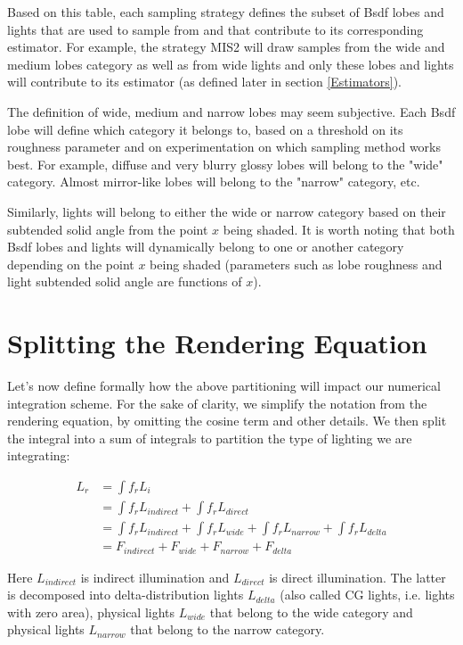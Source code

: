 \documentclass{article}
\begin{document}
Based on this table, each sampling strategy defines the
subset of Bsdf lobes and lights that are used to sample from and
that contribute to its corresponding estimator. For example, the
strategy MIS2 will draw samples from the wide and medium lobes category
as well as from wide lights and only these lobes and lights will contribute
to its estimator (as defined later in section \ref{Estimators}).

The definition of wide, medium and narrow lobes may seem subjective.
Each Bsdf lobe will define which category it belongs to, based
on a threshold on its roughness parameter and on experimentation on
which sampling method works best. For example, diffuse and very blurry
glossy lobes will belong to the "wide" category. Almost mirror-like
lobes will belong to the "narrow" category, etc.

Similarly, lights will belong to either the wide or narrow category
based on their subtended solid angle from the point $x$ being shaded.
It is worth noting that both Bsdf lobes and lights will dynamically belong
to one or another category depending on the point $x$ being shaded (parameters
such as lobe roughness and light subtended solid angle are functions of $x$).



\section{Splitting the Rendering Equation}\label{Splitting}

Let's now define formally how the above partitioning will impact our
numerical integration scheme. For the sake of clarity, we simplify
the notation from the rendering equation, by omitting the cosine
term and other details. We then split the integral into a sum of
integrals to partition the type of lighting we are integrating:

\begin{align*}
L_r &= \int f_r  L_i  \\
    &= \int f_r  L_{indirect}  +  \int f_r  L_{direct}  \\
    &= \int f_r  L_{indirect}  +  \int f_r  L_{wide}  +  \int f_r  L_{narrow}  +  \int f_r  L_{delta}  \\
    &= F_{indirect}  +  F_{wide}  +  F_{narrow}  +  F_{delta}
\end{align*}

Here $L_{indirect}$ is indirect illumination and $L_{direct}$ is
direct illumination. The latter is decomposed into
delta-distribution lights $L_{delta}$ (also called CG lights, i.e.
lights with zero area), physical lights $L_{wide}$ that belong to
the wide category and physical lights $L_{narrow}$ that belong to
the narrow category.
\end{document}
